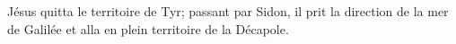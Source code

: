 \encetemps Jésus quitta le territoire de Tyr;
	passant par Sidon, il prit la direction de la mer de Galilée
	et alla en plein territoire de la Décapole.
